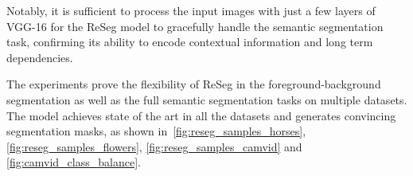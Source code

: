%
Notably, it is sufficient to process the input images with just a few layers of
VGG-16 for the ReSeg model to gracefully handle the semantic segmentation task,
confirming its ability to encode contextual information and long term
dependencies.

The experiments prove the flexibility of ReSeg in the foreground-background
segmentation as well as the full semantic segmentation tasks on multiple
datasets. The model achieves state of the art in all the datasets and generates
convincing segmentation masks, as shown in~\autoref{fig:reseg_samples_horses},
\autoref{fig:reseg_samples_flowers}, \autoref{fig:reseg_samples_camvid} and
\autoref{fig:camvid_class_balance}.

